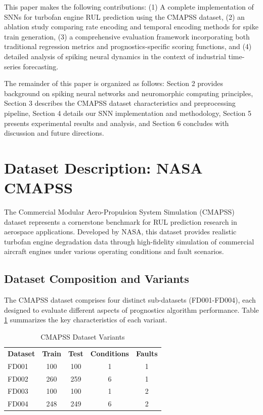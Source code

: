 \documentclass[11pt]{article}
\begin{document}
This paper makes the following contributions: (1) A complete implementation of SNNs for turbofan engine RUL prediction using the CMAPSS dataset, (2) an ablation study comparing rate encoding and temporal encoding methods for spike train generation, (3) a comprehensive evaluation framework incorporating both traditional regression metrics and prognostics-specific scoring functions, and (4) detailed analysis of spiking neural dynamics in the context of industrial time-series forecasting.

The remainder of this paper is organized as follows: Section 2 provides background on spiking neural networks and neuromorphic computing principles, Section 3 describes the CMAPSS dataset characteristics and preprocessing pipeline, Section 4 details our SNN implementation and methodology, Section 5 presents experimental results and analysis, and Section 6 concludes with discussion and future directions.

\section{Dataset Description: NASA CMAPSS}

The Commercial Modular Aero-Propulsion System Simulation (CMAPSS) dataset represents a cornerstone benchmark for RUL prediction research in aerospace applications. Developed by NASA, this dataset provides realistic turbofan engine degradation data through high-fidelity simulation of commercial aircraft engines under various operating conditions and fault scenarios.

\subsection{Dataset Composition and Variants}

The CMAPSS dataset comprises four distinct sub-datasets (FD001-FD004), each designed to evaluate different aspects of prognostics algorithm performance. Table \ref{tab:cmapss_variants} summarizes the key characteristics of each variant.

\begin{table}[h]
\centering
\caption{CMAPSS Dataset Variants}
\label{tab:cmapss_variants}
\begin{tabular}{lcccc}
\textbf{Dataset} & \textbf{Train} & \textbf{Test} & \textbf{Conditions} & \textbf{Faults} \\
FD001 & 100 & 100 & 1 & 1 \\
FD002 & 260 & 259 & 6 & 1 \\
FD003 & 100 & 100 & 1 & 2 \\
FD004 & 248 & 249 & 6 & 2 \\
\end{tabular}
\end{table}
\end{document}
